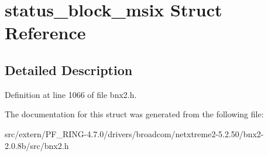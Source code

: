\hypertarget{structstatus__block__msix}{
\section{status\_\-block\_\-msix Struct Reference}
\label{structstatus__block__msix}
}


\subsection{Detailed Description}


Definition at line 1066 of file bnx2.h.



The documentation for this struct was generated from the following file:\begin{DoxyCompactItemize}
\item 
src/extern/PF\_\-RING-\/4.7.0/drivers/broadcom/netxtreme2-\/5.2.50/bnx2-\/2.0.8b/src/bnx2.h\end{DoxyCompactItemize}
